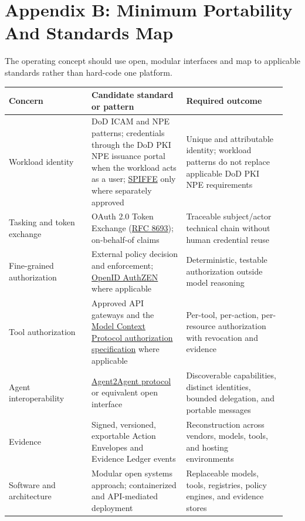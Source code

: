 \documentclass[11pt]{article}
\begin{document}
\hypertarget{appendix-b-minimum-portability-and-standards-map}{%
\section{Appendix B: Minimum Portability And Standards
Map}\label{appendix-b-minimum-portability-and-standards-map}}

The operating concept should use open, modular interfaces and map to
applicable standards rather than hard-code one platform.

\begingroup\footnotesize\setlength{\tabcolsep}{3pt}\begin{longtable}{p{0.28\linewidth}p{0.32\linewidth}p{0.34\linewidth}}
\toprule\noalign{}
Concern & Candidate standard or pattern & Required outcome \\
\midrule\noalign{}
\endhead
\bottomrule\noalign{}
\endlastfoot
Workload identity & DoD ICAM and NPE patterns; credentials through the
DoD PKI NPE issuance portal when the workload acts as a user;
\href{https://spiffe.io/docs/latest/}{SPIFFE} only where separately
approved & Unique and attributable identity; workload patterns do not
replace applicable DoD PKI NPE requirements \\
Tasking and token exchange & OAuth 2.0 Token Exchange
(\href{https://www.rfc-editor.org/rfc/rfc8693}{RFC 8693}); on-behalf-of
claims & Traceable subject/actor technical chain without human
credential reuse \\
Fine-grained authorization & External policy decision and enforcement;
\href{https://openid.net/wg/authzen/}{OpenID AuthZEN} where applicable &
Deterministic, testable authorization outside model reasoning \\
Tool authorization & Approved API gateways and the
\href{https://modelcontextprotocol.io/specification/draft/basic/authorization}{Model
Context Protocol authorization specification} where applicable &
Per-tool, per-action, per-resource authorization with revocation and
evidence \\
Agent interoperability &
\href{https://a2a-protocol.org/latest/specification/}{Agent2Agent
protocol} or equivalent open interface & Discoverable capabilities,
distinct identities, bounded delegation, and portable messages \\
Evidence & Signed, versioned, exportable Action Envelopes and Evidence
Ledger events & Reconstruction across vendors, models, tools, and
hosting environments \\
Software and architecture & Modular open systems approach; containerized
and API-mediated deployment & Replaceable models, tools, registries,
policy engines, and evidence stores \\
\end{longtable}\endgroup
\end{document}
